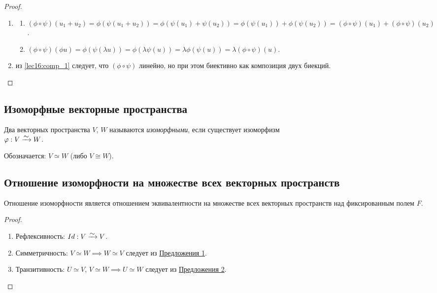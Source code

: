 \begin{proof}~
    \begin{enumerate}
    \item \label{lec16:comp_1}
        \begin{enumerate}[label=(\arabic*)]
            \item $(\phi \circ \psi)(u_1 + u_2) = \phi(\psi(u_1 + u_2)) = \phi(\psi(u_1) + \psi(u_2)) = \phi(\psi(u_1)) + \phi(\psi(u_2)) = (\phi \circ \psi)(u_1) + (\phi \circ \psi)(u_2)$.
            \item $(\phi \circ \psi)(\phi u) = \phi(\psi(\lambda u)) = \phi(\lambda \psi(u)) = \lambda \phi(\psi(u)) = \lambda(\phi \circ \psi)(u)$.
        \end{enumerate}
    \item из \ref{lec16:comp_1} следует, что $(\phi \circ \psi)$ линейно, но при этом биективно как композиция двух биекций.
        \qedhere
    \end{enumerate}
\end{proof}


\subsection{Изоморфные векторные пространства}

\begin{definition}
    Два векторных пространства $V$, $W$ называются \textit{изоморфными}, если существует изоморфизм \\ ${\phi: V \MapsTo W}$.

    Обозначается: $V \simeq W$ (либо $V \cong W$).
\end{definition}


\subsection{Отношение изоморфности на множестве всех векторных пространств}

\begin{theorem}
    Отношение изоморфности является отношением эквивалентности на множестве всех векторных пространств над фиксированным полем $F$.
\end{theorem}

\begin{proof}~
    \begin{enumerate}
    \item Рефлексивность: $Id: V \MapsTo V$.
    \item Симметричность: $V \simeq W \implies W \simeq V$ следует из \hyperref[lec16:prop_1]{Предложения 1}.
    \item Транзитивность: $U \simeq V$, $V \simeq W \implies U \simeq W$ следует из \hyperref[lec16:prop_2]{Предложения 2}.
        \qedhere
    \end{enumerate}
\end{proof}


